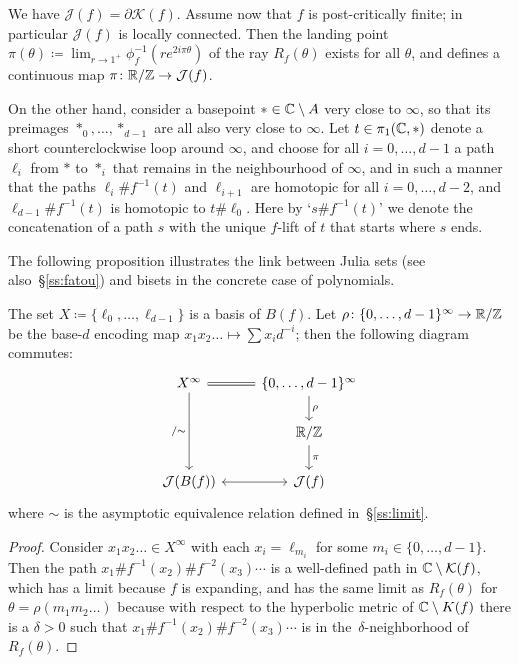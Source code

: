 \documentclass{amsart}
\newcommand\Julia{{\mathcal J}}
\begin{document}
We have $\Julia(f)=\partial\mathcal K(f)$. Assume now that $f$ is post-critically finite; in particular $\Julia(f)$ is locally connected. Then the landing point
$\pi(\theta)\coloneqq\lim_{r\to1^+}\phi_f^{-1}(re^{2i\pi\theta})$ of
the ray $R_f(\theta)$ exists for all $\theta$, and defines a
continuous map $\pi\colon\R/\Z\to\Julia(f)$.

On the other hand, consider a basepoint $*\in{\mathbb C}\setminus A$ very close
to $\infty$, so that its preimages $*_0,\dots,*_{d-1}$ are all also
very close to $\infty$. Let $t\in\pi_1({\mathbb C},*)$ denote a short
counterclockwise loop around $\infty$, and choose for all
$i=0,\dots,d-1$ a path $\ell_i$ from $*$ to $*_i$ that remains in the
neighbourhood of $\infty$, and in such a manner that the paths
$\ell_i\#f^{-1}(t)$ and $\ell_{i+1}$ are homotopic for all
$i=0,\dots,d-2$, and $\ell_{d-1}\#f^{-1}(t)$ is homotopic to
$t\#\ell_0$. Here by `$s\#f^{-1}(t)$' we denote the concatenation of a
path $s$ with the unique $f$-lift of $t$ that starts where $s$ ends.

The following proposition illustrates the link between Julia sets (see
also~\S\ref{ss:fatou}) and bisets in the concrete case of polynomials.

\begin{prop}
\label{prop:JuliaEncod}
  The set $X\coloneqq\{\ell_0,\dots,\ell_{d-1}\}$ is a basis of $B(f)$. Let
  $\rho\colon\{0,\dots,d-1\}^\infty\to{\mathbb R}/{\mathbb Z}$ be the base-$d$ encoding
  map $x_1x_2\dots\mapsto\sum x_i d^{-i}$; then the following diagram
  commutes:
  \[\begin{tikzcd}
      X^\infty\ar[r,equal]\ar[dd,swap,"/{\sim}"] & \{0,\dots,d-1\}^\infty\ar[d,"\rho"]\\
      & \R/\Z\ar[d,"\pi"]\\
      \Julia(B(f))\ar[r,<->] & \Julia(f)
    \end{tikzcd}
  \]
  where $\sim$ is the asymptotic equivalence relation defined
  in~\S\ref{ss:limit}.
\end{prop}
\begin{proof}
  Consider $x_1 x_2\dots\in X^\infty$ with each $x_i=\ell_{m_i}$ for
  some $m_i\in\{0,\dots,d-1\}$. Then the path
  $x_1\#f^{-1}(x_2)\#f^{-2}(x_3)\cdots$ is a well-defined path in
  ${\mathbb C}\setminus \mathcal K(f)$, which has a limit because $f$ is
  expanding, and has the same limit as $R_f(\theta)$ for
  $\theta=\rho(m_1m_2\dots)$ because with respect to the hyperbolic metric of ${{\mathbb C}}\setminus K(f)$ there is a $\delta>0$ such that $x_1\#f^{-1}(x_2)\#f^{-2}(x_3)\cdots$ is in the~$\delta$-neighborhood of $R_f(\theta)$.
\end{proof}
\end{document}
